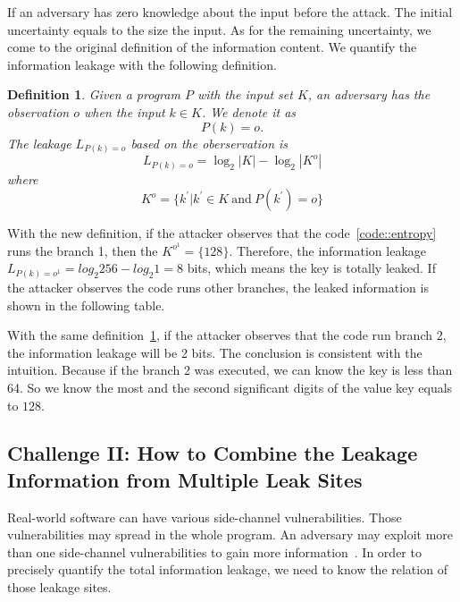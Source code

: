 If an adversary has zero knowledge about the input before the attack. The initial uncertainty
equals to the size the input. As for the remaining uncertainty, we come to the original definition
of the information content.
We quantify the information leakage with the following definition. 

\newtheorem{mydef}{Definition}

\begin{mydef}
\label{def}
Given a program $P$ with the input set $K$, 
an adversary has the observation $o$ when the input $k{\in}K$. 
We denote it as
    $$P(k) = o.$$
The leakage $L_{P(k)=o}$ based on the oberservation is
    $$L_{P(k)=o} = \log_2{|K|} - \log_2{|K^o|}$$
    where
    $$K^o = \{k^{'} | k^{'}{\in}K \ \text{and} \ P(k^{'}) = o \}$$
\end{mydef}

With the new definition, if the attacker observes that the code~\ref{code::entropy} runs the branch 1, 
then the $K^{o^{1}} = \{128\}$. Therefore, the information leakage $L_{P(k)=o^{1}} = log_2{256} - log_2{1} = 8$
bits, which means the key is totally leaked. If the attacker observes the code runs other
branches, the leaked information is shown in the following table.

\begin{table}[h]
    \centering
    \caption{The leaked information by the definition~\ref{def}}
\end{table}

With the same definition~\ref{def}, if the attacker observes that the code run branch 2, the information
leakage will be 2 bits. The conclusion is consistent with the intuition. Because if the branch 2 was
executed, we can know the key is less than 64. So we know the most and the second significant digits of 
the value key equals to $128$.

\subsection{Challenge II: How to Combine the Leakage Information from Multiple Leak Sites}
Real-world software can have various side-channel vulnerabilities. Those vulnerabilities 
may spread in the whole program. An adversary may exploit more than one side-channel vulnerabilities 
to gain more information~\cite{7163052, 191010}. In order to precisely quantify the
total information leakage, we need to know the relation of those leakage sites. 


